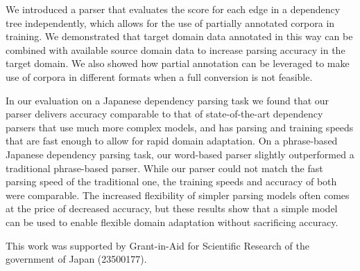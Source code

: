 \documentclass[english]{jnlp_1.4}
\begin{document}
We introduced a parser that evaluates the score for each edge in a
dependency tree independently, which allows for the use of partially
annotated corpora in training. We demonstrated that target domain data
annotated in this way can be combined with available source domain
data to increase parsing accuracy in the target domain. We also showed
how partial annotation can be leveraged to make use of corpora in
different formats when a full conversion is not feasible.

In our evaluation on a Japanese dependency parsing task we found that
our parser delivers accuracy comparable to that of state-of-the-art
dependency parsers that use much more complex models, and has parsing
and training speeds that are fast enough to allow for rapid domain
adaptation. On a phrase-based Japanese dependency parsing task, our
word-based parser slightly outperformed a traditional phrase-based
parser. While our parser could not match the fast parsing speed of the
traditional one, the training speeds and accuracy of both were
comparable. The increased flexibility of simpler parsing models often
comes at the price of decreased accuracy, but these results show that
a simple model can be used to enable flexible domain adaptation
without sacrificing accuracy.




\acknowledgment

This work was supported by Grant-in-Aid for Scientific Research of the
government of Japan (23500177).
\end{document}
